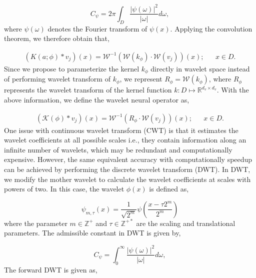 \documentclass{article}
\begin{document}
\begin{equation}
    C_{\psi}= 2\pi \int_{D} \frac{{|\psi (\omega)|}^2}{|\omega|} d \omega,
\end{equation}
where $\psi (\omega)$ denotes the Fourier transform of $\psi (x)$. Applying the convolution theorem, we therefore obtain that,

\begin{equation}\label{eq:conv_pre}
    \begin{aligned}
        \left(K(a ; \phi) * v_{j}\right)(x) = \mathcal{W}^{-1}\left( \mathcal{W}(k_{\phi}) \cdot \mathcal{W} (v_{j})\right)(x); && x \in D.
    \end{aligned}
\end{equation}
Since we propose to parameterize the kernel $k_{\phi}$ directly in wavelet space instead of performing wavelet transform of $k_{\phi}$, we represent $R_{\phi} = \mathcal{W}(k_{\phi})$, where $R_{\phi}$ represents the wavelet transform of the kernel function $k:D \mapsto \mathbb{R}^{d_{v} \times d_{v}}$. With the above information, we define the wavelet neural operator as,

\begin{equation}\label{eq:conv_final}
    \begin{aligned}
        \left(\mathcal{K}(\phi) * v_{j}\right)(x)=\mathcal{W}^{-1}\left(R_{\phi} \cdot \mathcal{W}( v_{j})\right)(x); && x \in D.
    \end{aligned}
\end{equation}
One issue with continuous wavelet transform (CWT) is that it estimates the wavelet coefficients at all possible scales i.e., they contain information along an infinite number of wavelets, which may be redundant and computationally expensive. However, the same equivalent accuracy with computationally speedup can be achieved by performing the discrete wavelet transform (DWT). In DWT, we modify the mother wavelet to calculate the wavelet coefficients at scales with powers of two. In this case, the wavelet $\phi(x)$ is defined as, 

\begin{equation}
    \psi_{m, \tau}(x) = \frac{1}{\sqrt{2^{m}}} \psi\left(\frac{x - \tau 2^{m}}{2^{m}}\right)
\end{equation}
where the parameter $m \in \mathbb{Z}^{+}$ and $\tau \in \mathbb{Z}^{+*}$ are the scaling and translational parameters. The admissible constant in DWT is given by,

\begin{equation}
    C_{\psi}= \int_{0}^{\infty} \frac{{|\psi (\omega)|}^2}{|\omega|} d \omega,
\end{equation}
The forward DWT is given as,
\end{document}
